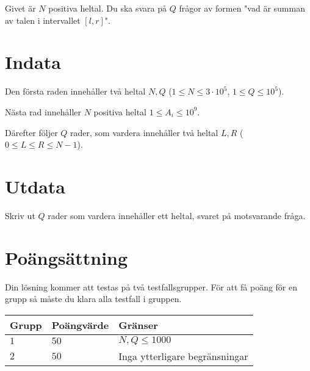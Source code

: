 Givet är $N$ positiva heltal. Du ska svara på $Q$ frågor av formen "vad är summan av talen i intervallet $[l,r]$".

\section*{Indata}
Den första raden innehåller två heltal $N, Q$ ($1 \leq N \leq 3 \cdot 10^5$, $1 \leq Q \leq 10^5$).

Nästa rad innehåller $N$ positiva heltal $1 \leq A_i \leq 10^9$.

Därefter följer $Q$ rader, som vardera innehåller två heltal $L,R$ ($0 \leq L \leq R \leq N-1$).

\section*{Utdata}
Skriv ut $Q$ rader som vardera innehåller ett heltal, svaret på motsvarande fråga.

\section*{Poängsättning}
Din lösning kommer att testas på två testfallsgrupper.
\noindent
För att få poäng för en grupp så måste du klara alla testfall i gruppen.

\noindent
\begin{tabular}{| l | l | l |}
\hline
  Grupp & Poängvärde & Gränser \\ \hline
  $1$    & $50$       &  $N,Q \leq 1000$ \\ \hline
  $2$    & $50$       &  Inga ytterligare begränsningar \\ \hline
\end{tabular}
